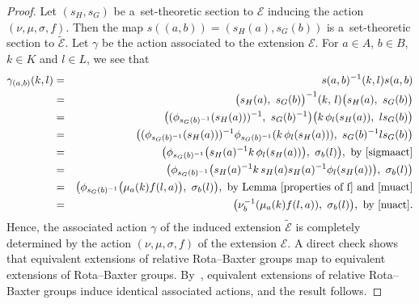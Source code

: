 \documentclass{jonasart}
\theoremstyle{plain}
\begin{document}
	\begin{proof}
		Let $(s_H, s_G )$ be a~set-theoretic section to $\mathcal{E}$ inducing the action $(\nu, \mu, \sigma, f)$. Then the map $s((a,b))=(s_H (a),s_G (b))$ is a~set-theoretic section to $\widetilde{\mathcal{E}}$. Let $\gamma$ be the action associated to the extension $\mathcal{E}$. For $a\in A$, $b\in B$, $k\in K$ and $l\in L$, we see that
		\begin{eqnarray*}
			\gamma_{(a,b)}(k,l)&=&s(a,b)^{-1}(k,l)s(a,b)\\
			&=& \big(s_H (a),~s_G (b)\big)^{-1}(k,\,l) \big(s_H (a),~s_G (b) \big)\\
			&=&\big((\phi_{s_G (b)^{-1}}(s_H (a)))^{-1},~s_G (b)^{-1} \big) \big(k\,\phi_l (s_H (a)),~ls_G (b)\big)\\
			&=&\big((\phi_{s_G (b)^{-1}}(s_H (a)))^{-1}\phi_{s_G (b)^{-1}}(k \,\phi_l (s_H (a))),~s_G (b)^{-1}ls_G (b)\big)\\
			&=&\big(\phi_{s_G (b)^{-1}}\big(s_H (a)^{-1}k\,\phi_l (s_H (a))\big),~\sigma_b (l)\big),~\text{by~\eqref{sigmaact}}\\
			&=&\big(\phi_{s_G (b)^{-1}}\big(s_H (a)^{-1}k\,s_H (a)s_H (a)^{-1}\phi_l (s_H (a))\big),~\sigma_b (l)\big)\\
			&=&\big(\phi_{s_G (b)^{-1}}\big(\mu_a (k)f(l,a)\big),~\sigma_b (l)\big),~\text{by Lemma~\eqref{properties of f} and~\eqref{muact}}\\
			&=& \big(\nu^{-1}_b (\mu_a (k)f(l,a)),~\sigma_b (l) \big),~\text{by~\eqref{nuact}.}
		\end{eqnarray*}
		Hence, the associated action $\gamma$ of the induced extension $\widetilde{\mathcal{E}}$ is completely determined by the action $(\nu,\mu,\sigma,f)$ of the extension $\mathcal{E}$. A direct check shows that equivalent extensions of relative Rota--Baxter groups map to equivalent extensions of Rota--Baxter groups. By~\cite[Proposition 3.17]{MR4819014}, equivalent extensions of relative Rota--Baxter groups induce identical associated actions, and the result follows.
	\end{proof}
	
\end{document}
